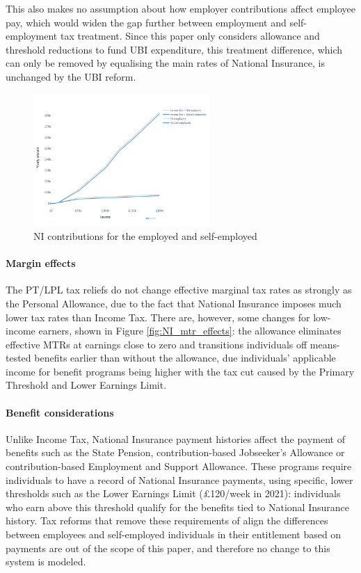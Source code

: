\documentclass{article}
\begin{document}
    This also makes no assumption about how employer contributions affect employee pay, which would widen the gap further between employment and self-employment tax treatment. Since this paper only considers allowance and threshold reductions to fund UBI expenditure, this treatment difference, which can only be removed by equalising the main rates of National Insurance, is unchanged by the UBI reform.

    \begin{figure}
        \centering
        \includegraphics[width=0.6\textwidth]{images/fig_8.png}
        \caption{NI contributions for the employed and self-employed}
        \label{fig:NI_self_emp_diff}
    \end{figure}

    \paragraph{Margin effects} The PT/LPL tax reliefs do not change effective marginal tax rates as strongly as the Personal Allowance, due to the fact that National Insurance imposes much lower tax rates than Income Tax. There are, however, some changes for low-income earners, shown in Figure \ref{fig:NI_mtr_effects}: the allowance eliminates effective MTRs at earnings close to zero and transitions individuals off means-tested benefits earlier than without the allowance, due individuals' applicable income for benefit programs being higher with the tax cut caused by the Primary Threshold and Lower Earnings Limit.

    \paragraph{Benefit considerations} Unlike Income Tax, National Insurance payment histories affect the payment of benefits such as the State Pension, contribution-based Jobseeker's Allowance or contribution-based Employment and Support Allowance. These programs require individuals to have a record of National Insurance payments, using specific, lower thresholds such as the Lower Earnings Limit (£120/week in 2021): individuals who earn above this threshold qualify for the benefits tied to National Insurance history. Tax reforms that remove these requirements of align the differences between employees and self-employed individuals in their entitlement based on payments are out of the scope of this paper, and therefore no change to this system is modeled.
\end{document}
